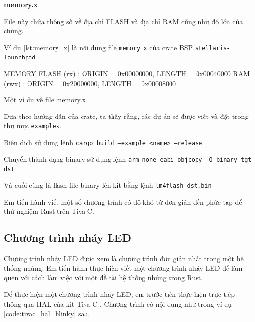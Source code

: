 \textbf{memory.x}

File này chứa thông số về địa chỉ FLASH và địa chỉ RAM cũng như độ lớn của chúng.

Ví dụ \ref{lst:memory_x} là nội dung file \texttt{memory.x} của crate BSP \texttt{stellaris-launchpad}.

\begin{listing}[ht]
\begin{plaintext}
MEMORY
{
    FLASH (rx) : ORIGIN = 0x00000000, LENGTH = 0x00040000
    RAM (rwx) : ORIGIN = 0x20000000, LENGTH = 0x00008000
}
\end{plaintext}
\caption{Một ví dụ về file memory.x}
\label{lst:memory_x}
\end{listing}

Dựa theo hướng dẫn của crate, ta thấy rằng, các dự án sẽ được viết và đặt trong thư mục \texttt{examples}.

Biên dịch sử dụng lệnh \texttt{cargo build --example <name> --release}.

Chuyển thành dạng binary sử dụng lệnh \texttt{arm-none-eabi-objcopy -O binary tgt dst}

Và cuối cùng là flash file binary lên kit bằng lệnh \texttt{lm4flash dst.bin}

Em tiến hành viết một số chương trình có độ khó từ đơn giản đến phức tạp để thử nghiệm Rust trên Tiva C.

\subsection{Chương trình nháy LED}\label{lbl:rust_blinky}
Chương trình nháy LED được xem là chương trình đơn giản nhất trong một hệ thống nhúng.
Em tiến hành thực hiện viết một chương trình nháy LED để làm quen với cách làm việc với một đề tài hệ thống nhúng trong Rust.

Để thực hiện một chương trình nháy LED, em trước tiên thực hiện trực tiếp thông qua HAL của kit Tiva C \cite{tm4c_hal}.
Chương trình có nội dung như trong ví dụ \ref{code:tivac_hal_blinky} sau.

